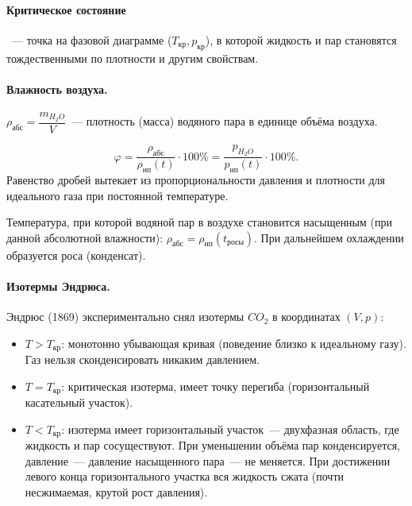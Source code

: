 \documentclass[12pt]{article}
\begin{document}
\paragraph{Критическое состояние}~--- точка на фазовой диаграмме ($T_{\text{кр}}, p_{\text{кр}}$), в которой жидкость и пар становятся тождественными по плотности и другим свойствам.

\paragraph{Влажность воздуха.}

\begin{definition}
	$\rho_{\text{абс}} = \dfrac{m_{H_2O}}{V}$~--- плотность (масса) водяного пара в единице объёма воздуха.
\end{definition}

\begin{definition}
	\[
		\varphi = \frac{\rho_{\text{абс}}}{\rho_{\text{нп}}(t)} \cdot 100\% = \frac{p_{H_2O}}{p_{\text{нп}}(t)} \cdot 100\%.
	\]
	Равенство дробей вытекает из пропорциональности давления и плотности для идеального газа при постоянной температуре.
\end{definition}

\begin{definition}
	Температура, при которой водяной пар в воздухе становится насыщенным (при данной абсолютной влажности): $\rho_{\text{абс}} = \rho_{\text{нп}}(t_{\text{росы}})$. При дальнейшем охлаждении образуется роса (конденсат).
\end{definition}

\paragraph{Изотермы Эндрюса.}
Эндрюс (1869) экспериментально снял изотермы $CO_2$ в координатах $(V, p)$:
\begin{itemize}
	\item $T > T_{\text{кр}}$: монотонно убывающая кривая (поведение близко к идеальному газу). Газ нельзя сконденсировать никаким давлением.
	\item $T = T_{\text{кр}}$: критическая изотерма, имеет точку перегиба (горизонтальный касательный участок).
	\item $T < T_{\text{кр}}$: изотерма имеет горизонтальный участок~--- двухфазная область, где жидкость и пар сосуществуют. При уменьшении объёма пар конденсируется, давление~--- давление насыщенного пара~--- не меняется. При достижении левого конца горизонтального участка вся жидкость сжата (почти несжимаемая, крутой рост давления).
\end{itemize}
\end{document}
